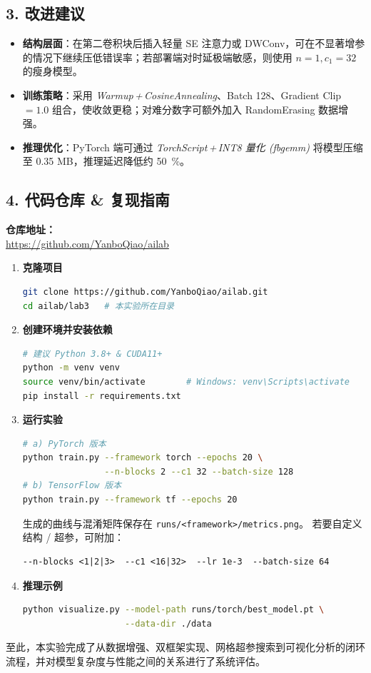 \documentclass[UTF8]{article}
\begin{document}
\subsection*{3. 改进建议}
\begin{itemize}
    \item \textbf{结构层面}：在第二卷积块后插入轻量 SE 注意力或 DWConv，可在不显著增参的情况下继续压低错误率；若部署端对时延极端敏感，则使用 \(n{=}1,c_1{=}32\) 的瘦身模型。  
    \item \textbf{训练策略}：采用 \emph{Warmup\,+\,CosineAnnealing}、Batch 128、Gradient Clip \(=1.0\) 组合，使收敛更稳；对难分数字可额外加入 RandomErasing 数据增强。  
    \item \textbf{推理优化}：PyTorch 端可通过 \emph{TorchScript\,+\,INT8 量化 (fbgemm)} 将模型压缩至 0.35 MB，推理延迟降低约 \SI{50}{\percent}。  
\end{itemize}

\subsection*{4. 代码仓库 \& 复现指南}

\textbf{仓库地址：}\\
\url{https://github.com/YanboQiao/ailab}

\begin{enumerate}
    \item \textbf{克隆项目}
\begin{lstlisting}[language=bash]
git clone https://github.com/YanboQiao/ailab.git
cd ailab/lab3   # 本实验所在目录
\end{lstlisting}
    \item \textbf{创建环境并安装依赖}
\begin{lstlisting}[language=bash]
# 建议 Python 3.8+ & CUDA11+
python -m venv venv
source venv/bin/activate        # Windows: venv\Scripts\activate
pip install -r requirements.txt
\end{lstlisting}
    \item \textbf{运行实验}
\begin{lstlisting}[language=bash]
# a) PyTorch 版本
python train.py --framework torch --epochs 20 \
                --n-blocks 2 --c1 32 --batch-size 128
# b) TensorFlow 版本
python train.py --framework tf --epochs 20
\end{lstlisting}
生成的曲线与混淆矩阵保存在 \texttt{runs/<framework>/metrics.png}。  
若要自定义结构 / 超参，可附加：
\begin{lstlisting}
--n-blocks <1|2|3>  --c1 <16|32>  --lr 1e-3  --batch-size 64
\end{lstlisting}
    \item \textbf{推理示例}
\begin{lstlisting}[language=bash]
python visualize.py --model-path runs/torch/best_model.pt \
                    --data-dir ./data
\end{lstlisting}
\end{enumerate}

\vspace{0.5em}
至此，本实验完成了从数据增强、双框架实现、网格超参搜索到可视化分析的闭环流程，并对模型复杂度与性能之间的关系进行了系统评估。
\end{document}
